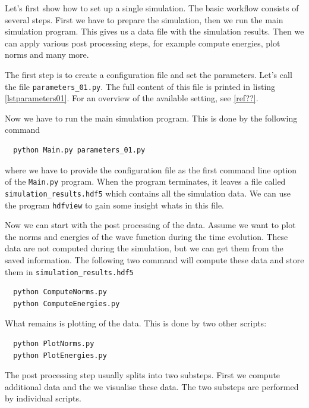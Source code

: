 \documentclass[a4paper,10pt]{report}
\begin{document}
Let's first show how to set up a single simulation. The basic workflow consists of
several steps. First we have to prepare the simulation, then we run the main simulation
program. This gives us a data file with the simulation results. Then we can apply various
post processing steps, for example compute energies, plot norms and many more.

The first step is to create a configuration file and set the parameters. Let's
call the file \texttt{parameters\_01.py}. The full content of this file is printed
in listing \ref{lstparameters01}. For an overview of the available setting, see \ref{ref??}.

Now we have to run the main simulation program. This is done by the following command

\begin{verbatim}
  python Main.py parameters_01.py
\end{verbatim}

where we have to provide the configuration file as the first command line option
of the \texttt{Main.py} program. When the program terminates, it leaves a file
called \texttt{simulation\_results.hdf5} which contains all the simulation data.
We can use the program \texttt{hdfview} to gain some insight whats in this file.

Now we can start with the post processing of the data. Assume we want to plot
the norms and energies of the wave function during the time evolution. These data
are not computed during the simulation, but we can get them from the saved
information. The following two command will compute these data and store them
in \texttt{simulation\_results.hdf5}

\begin{verbatim}
  python ComputeNorms.py
  python ComputeEnergies.py
\end{verbatim}

What remains is plotting of the data. This is done by two other scripts:

\begin{verbatim}
  python PlotNorms.py
  python PlotEnergies.py
\end{verbatim}

The post processing step usually splits into two substeps. First we compute additional
data and the we visualise these data. The two substeps are performed by individual
scripts.
\end{document}
